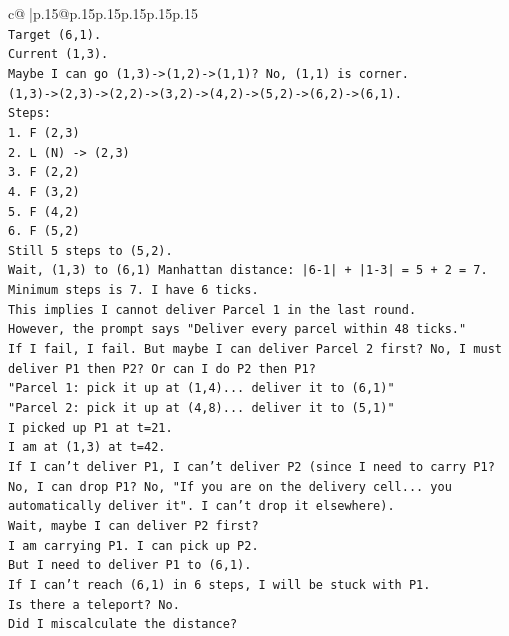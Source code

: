 \documentclass{article}
\begin{document}
{\begin{supertabular}{c@{$\;$}|p{.15\linewidth}@{}p{.15\linewidth}p{.15\linewidth}p{.15\linewidth}p{.15\linewidth}p{.15\linewidth}}
{{{\\ 
\texttt{Target (6,1).} \\
\texttt{Current (1,3).} \\
\texttt{Maybe I can go (1,3){-}>(1,2){-}>(1,1)? No, (1,1) is corner.} \\
\texttt{(1,3){-}>(2,3){-}>(2,2){-}>(3,2){-}>(4,2){-}>(5,2){-}>(6,2){-}>(6,1).} \\
\texttt{Steps:} \\
\texttt{1. F (2,3)} \\
\texttt{2. L (N) {-}> (2,3)} \\
\texttt{3. F (2,2)} \\
\texttt{4. F (3,2)} \\
\texttt{5. F (4,2)} \\
\texttt{6. F (5,2)} \\
\texttt{Still 5 steps to (5,2).} \\
\texttt{Wait, (1,3) to (6,1) Manhattan distance: |6{-}1| + |1{-}3| = 5 + 2 = 7.} \\
\texttt{Minimum steps is 7. I have 6 ticks.} \\
\texttt{This implies I cannot deliver Parcel 1 in the last round.} \\
\texttt{However, the prompt says "Deliver every parcel within 48 ticks."} \\
\texttt{If I fail, I fail. But maybe I can deliver Parcel 2 first? No, I must deliver P1 then P2? Or can I do P2 then P1?} \\
\texttt{"Parcel 1: pick it up at (1,4)... deliver it to (6,1)"} \\
\texttt{"Parcel 2: pick it up at (4,8)... deliver it to (5,1)"} \\
\texttt{I picked up P1 at t=21.} \\
\texttt{I am at (1,3) at t=42.} \\
\texttt{If I can't deliver P1, I can't deliver P2 (since I need to carry P1? No, I can drop P1? No, "If you are on the delivery cell... you automatically deliver it". I can't drop it elsewhere).} \\
\texttt{Wait, maybe I can deliver P2 first?} \\
\texttt{I am carrying P1. I can pick up P2.} \\
\texttt{But I need to deliver P1 to (6,1).} \\
\texttt{If I can't reach (6,1) in 6 steps, I will be stuck with P1.} \\
\texttt{Is there a teleport? No.} \\
\texttt{Did I miscalculate the distance?} \\
}}}
\end{supertabular}}
\end{document}
